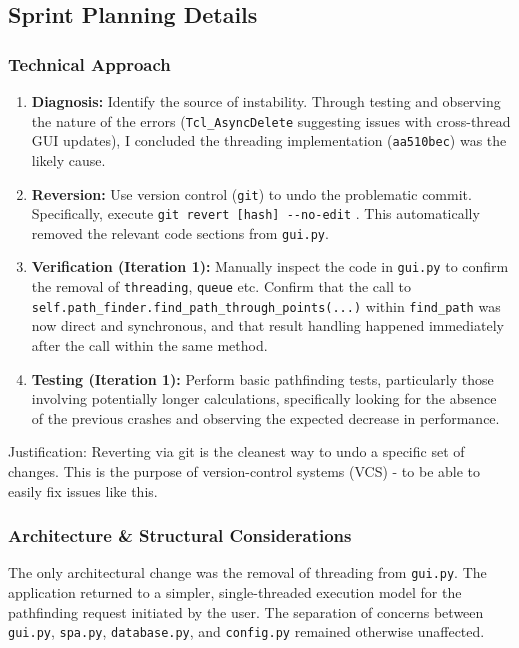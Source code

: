 \subsection{Sprint Planning Details}

\subsubsection{Technical Approach}
\begin{enumerate}
	\item \textbf{Diagnosis:} Identify the source of instability. Through testing and observing the nature of the errors (\verb|Tcl_AsyncDelete| suggesting issues with cross-thread GUI updates), I concluded the threading implementation (\verb|aa510bec|) was the likely cause.
	\item \textbf{Reversion:} Use version control (\verb|git|) to undo the problematic commit. Specifically, execute \verb|git revert [hash] --no-edit| . This automatically removed the relevant code sections from \verb|gui.py|.
	\item \textbf{Verification (Iteration 1):} Manually inspect the code in \verb|gui.py| to confirm the removal of \verb|threading|, \verb|queue| etc. Confirm that the call to \verb|self.path_finder.find_path_through_points(...)| within \verb|find_path| was now direct and synchronous, and that result handling happened immediately after the call within the same method.
	\item \textbf{Testing (Iteration 1):} Perform basic pathfinding tests, particularly those involving potentially longer calculations, specifically looking for the absence of the previous crashes and observing the expected decrease in performance.
\end{enumerate}
Justification: Reverting via git is the cleanest way to undo a specific set of changes. This is the purpose of version-control systems (VCS) - to be able to easily fix issues like this.

\subsubsection{Architecture \& Structural Considerations}
The only architectural change was the removal of threading from \verb|gui.py|. The application returned to a simpler, single-threaded execution model for the pathfinding request initiated by the user. The separation of concerns between \verb|gui.py|, \verb|spa.py|, \verb|database.py|, and \verb|config.py| remained otherwise unaffected.

